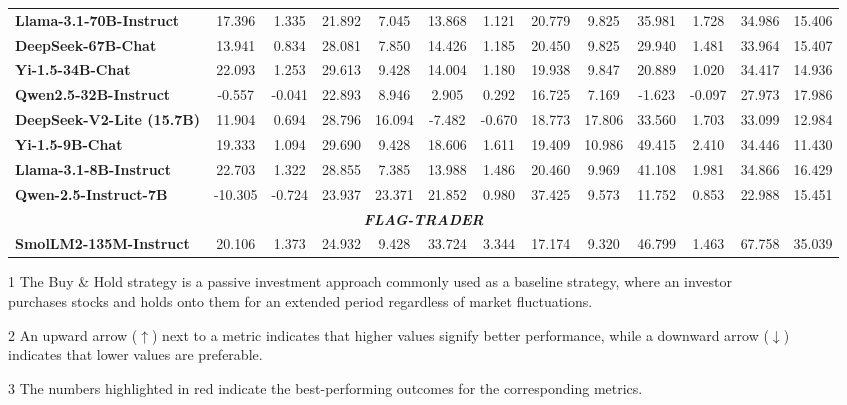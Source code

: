\begin{table*}[thbp]
\begin{threeparttable}
{\begin{tabular}{@{}lcccc|cccc|cccc@{}}
\textbf{Llama-3.1-70B-Instruct}  
& 17.396 & 1.335 & 21.892 & 7.045 
& 13.868 & 1.121 & 20.779 & 9.825 
& 35.981 & 1.728 & 34.986 & 15.406\\
\textbf{DeepSeek-67B-Chat} 
& 13.941 & 0.834 & 28.081 & 7.850 
& 14.426 & 1.185 & 20.450 & 9.825 
& 29.940 & 1.481 & 33.964 & 15.407\\
\textbf{Yi-1.5-34B-Chat}  
& 22.093 & 1.253 & 29.613 & 9.428 
& 14.004 & 1.180 & 19.938 & 9.847 
& 20.889 & 1.020 & 34.417 & 14.936\\
\textbf{Qwen2.5-32B-Instruct}  
& -0.557 & -0.041 & 22.893 & 8.946 
& 2.905 & 0.292 & 16.725 & 7.169 
& -1.623 & -0.097 & 27.973 & 17.986\\
\textbf{DeepSeek-V2-Lite (15.7B)}  
& 11.904 & 0.694 & 28.796 & 16.094 
& -7.482 & -0.670 & 18.773 & 17.806 
& 33.560 & 1.703 & 33.099 & 12.984\\
\textbf{Yi-1.5-9B-Chat}  
& 19.333 & 1.094 & 29.690 & 9.428 
& 18.606 & 1.611 & 19.409 & 10.986 
& 49.415 & 2.410 & 34.446 & 11.430\\
\textbf{Llama-3.1-8B-Instruct}  
& 22.703 & 1.322 & 28.855 & 7.385 
& 13.988 & 1.486 & 20.460 & 9.969 
& 41.108 & 1.981 & 34.866 & 16.429\\
\textbf{Qwen-2.5-Instruct-7B}  
& -10.305 & -0.724 & 23.937 & 23.371 
& 21.852 & 0.980 & 37.425 & 9.573 
& 11.752 & 0.853 & 22.988 & 15.451\\
\midrule
\multicolumn{13}{c}{\textit{\textbf{FLAG-TRADER }}}\\
\textbf{SmolLM2-135M-Instruct}  
& 20.106 & 1.373 & 24.932 & 9.428 
& 33.724 & 3.344 & 17.174 & 9.320
& 46.799 & 1.463 & 67.758 & 35.039\\
\bottomrule
\end{tabular}
}
\begin{tablenotes}
    \footnotesize
    \item[1] \small{The Buy \& Hold strategy is a passive investment approach commonly used as a baseline strategy, where an investor \\ purchases stocks and holds onto them for an extended period regardless of market fluctuations.}
    \item[2] \small{An upward arrow (\(\uparrow\)) next to a metric indicates that higher values signify better performance, while a downward arrow (\(\downarrow\))} \\
indicates that lower values are preferable.
    \item[3] \small{The numbers highlighted in red indicate the best-performing outcomes for the corresponding metrics.}
\end{tablenotes}
\end{threeparttable}
\vspace{-0.0cm}
\end{table*}


